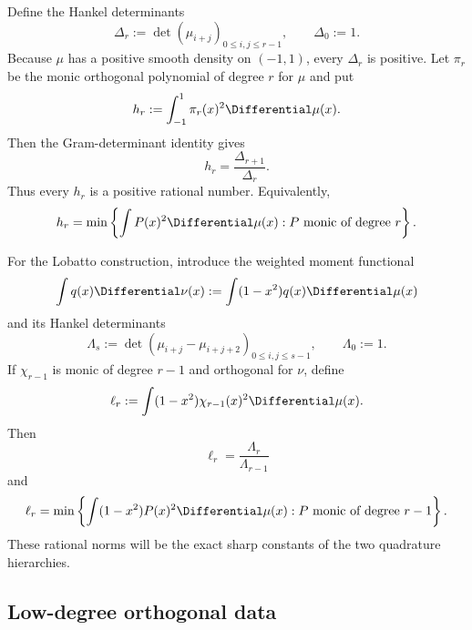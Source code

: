 \documentclass[11pt]{article}
\numberwithin{equation}{section}
\theoremstyle{definition}
\theoremstyle{remark}
\begin{document}
Define the Hankel determinants
\begin{equation}
 \Delta_r:=\det(\mu_{i+j})_{0\le i,j\le r-1},
 \qquad \Delta_0:=1.
 \label{p1:eq:Hankel}
\end{equation}
Because $\mu$ has a positive smooth density on $(-1,1)$, every $\Delta_r$ is positive.  Let $\pi_r$ be the monic orthogonal polynomial of degree $r$ for $\mu$ and put
\begin{equation}
 h_r:=\int_{-1}^{1}\pi_r(x)^2\Differential\mu(x).
 \label{p1:eq:hr}
\end{equation}
Then the Gram-determinant identity gives
\begin{equation}
 \boxed{h_r=\frac{\Delta_{r+1}}{\Delta_r}.}
 \label{p1:eq:hr-determinant}
\end{equation}
Thus every $h_r$ is a positive rational number.  Equivalently,
\begin{equation}
 h_r=\min\left\{\int P(x)^2\Differential\mu(x):P\text{ monic of degree }r\right\}.
 \label{p1:eq:hr-minimizer}
\end{equation}

For the Lobatto construction, introduce the weighted moment functional
\begin{equation}
 \int q(x)\Differential\nu(x):=\int(1-x^2)q(x)\Differential\mu(x)
 \label{p1:eq:nu-weighted}
\end{equation}
and its Hankel determinants
\begin{equation}
 \Lambda_s:=\det(\mu_{i+j}-\mu_{i+j+2})_{0\le i,j\le s-1},
 \qquad \Lambda_0:=1.
 \label{p1:eq:Lambda}
\end{equation}
If $\chi_{r-1}$ is monic of degree $r-1$ and orthogonal for $\nu$, define
\begin{equation}
 \ell_r:=\int(1-x^2)\chi_{r-1}(x)^2\Differential\mu(x).
 \label{p1:eq:ellr}
\end{equation}
Then
\begin{equation}
 \boxed{\ell_r=\frac{\Lambda_r}{\Lambda_{r-1}}}
 \label{p1:eq:ellr-determinant}
\end{equation}
and
\begin{equation}
 \ell_r=\min\left\{\int(1-x^2)P(x)^2\Differential\mu(x):P\text{ monic of degree }r-1\right\}.
 \label{p1:eq:ellr-minimizer}
\end{equation}
These rational norms will be the exact sharp constants of the two quadrature hierarchies.

\subsection{Low-degree orthogonal data}
\end{document}
